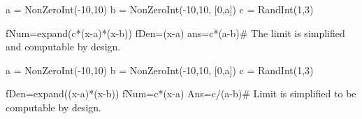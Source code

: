 







\begin{sagesilent}
a = NonZeroInt(-10,10)
b = NonZeroInt(-10,10, [0,a])
c = RandInt(1,3)

fNum=expand(c*(x-a)*(x-b))
fDen=(x-a)
ans=c*(a-b)# The limit is simplified and computable by design.
\end{sagesilent}



\begin{sagesilent}
a = NonZeroInt(-10,10)
b = NonZeroInt(-10,10, [0,a])
c = RandInt(1,3)

fDen=expand((x-a)*(x-b))
fNum=c*(x-a)
Ans=c/(a-b)# Limit is simplified to be computable by design.
\end{sagesilent}





